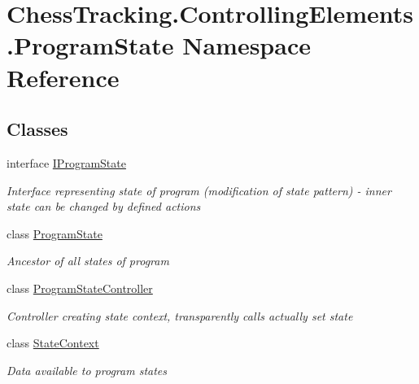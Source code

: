 \hypertarget{namespace_chess_tracking_1_1_controlling_elements_1_1_program_state}{}\section{Chess\+Tracking.\+Controlling\+Elements.\+Program\+State Namespace Reference}
\label{namespace_chess_tracking_1_1_controlling_elements_1_1_program_state}
\subsection*{Classes}
\begin{DoxyCompactItemize}
\item 
interface \mbox{\hyperlink{interface_chess_tracking_1_1_controlling_elements_1_1_program_state_1_1_i_program_state}{I\+Program\+State}}
\begin{DoxyCompactList}\small\item\em Interface representing state of program (modification of state pattern) -\/ inner state can be changed by defined actions \end{DoxyCompactList}\item 
class \mbox{\hyperlink{class_chess_tracking_1_1_controlling_elements_1_1_program_state_1_1_program_state}{Program\+State}}
\begin{DoxyCompactList}\small\item\em Ancestor of all states of program \end{DoxyCompactList}\item 
class \mbox{\hyperlink{class_chess_tracking_1_1_controlling_elements_1_1_program_state_1_1_program_state_controller}{Program\+State\+Controller}}
\begin{DoxyCompactList}\small\item\em Controller creating state context, transparently calls actually set state \end{DoxyCompactList}\item 
class \mbox{\hyperlink{class_chess_tracking_1_1_controlling_elements_1_1_program_state_1_1_state_context}{State\+Context}}
\begin{DoxyCompactList}\small\item\em Data available to program states \end{DoxyCompactList}\end{DoxyCompactItemize}
